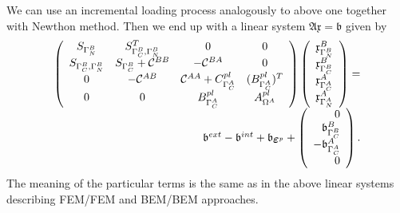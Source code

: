\documentclass[12pt,a4paper]{scrbook}
\begin{document}
We can use an incremental loading process analogously to above one together with Newthon method. Then we end up with a linear system ${\mathfrak A} {\mathfrak x} = {\mathfrak b}$ given by
\begin{equation*}
 \begin{array}{r}
   \left (
   \begin{array}{cccc}
   S_{\Gamma^{B}_N}    & S^{T}_{\Gamma^{B}_C,\Gamma^{B}_N}                 & 0                & 0\\
   S_{\Gamma^{B}_C,\Gamma^{B}_N} & S_{\Gamma^{B}_C} + \mathcal{C}^{B B}   & -\mathcal{C}^{B A}& 0 \\
   0               & -\mathcal{C}^{A B} & \mathcal{C}^{A A}+ C^{pl}_{\Gamma^{A}_C}  & (B^{pl}_{\Gamma^{A}_C})^T \\
   0               & 0                 & B^{pl}_{\Gamma^{A}_C} & A^{pl}_{\Omega^{A}}
   \end{array}
   \right )
 \left (
  \begin{array}{l}
      \mathfrak x^{B}_{\Gamma_N^{B}} \\
      \mathfrak x^{B}_{\Gamma_C^{B}} \\
      \mathfrak x^{A}_{\Gamma_C^{A}} \\
      \mathfrak x^{A}_{\Gamma_N^{A}} 
  \end{array}
 \right )
= \\
 {\mathfrak b}^{ext} - {\mathfrak b}^{int} + {\mathfrak b}_{\mbox{\boldmath$\varepsilon$}^p} +
 \left (
  \begin{array}{r}
      0 \\
      {\mathfrak b}^{B}_{\Gamma_C^{B}} \\
      -{\mathfrak b}^{A}_{\Gamma_C^{A}} \\
      0 
  \end{array}
 \right ).
 \end{array}
\end{equation*}
The meaning of the particular terms is the same as in the above linear systems describing  FEM/FEM and BEM/BEM approaches.
\end{document}
